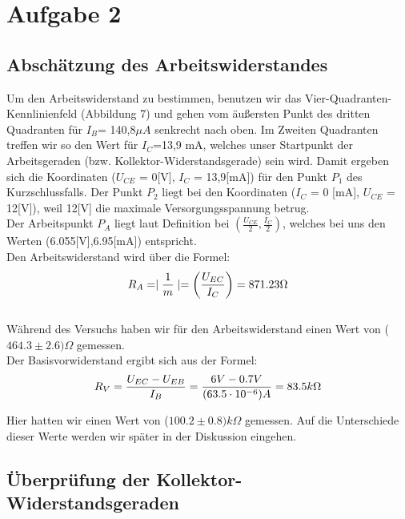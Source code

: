 \section{Aufgabe 2}
\subsection{Abschätzung des Arbeitswiderstandes}

Um den Arbeitswiderstand zu bestimmen, benutzen wir das Vier-Quadranten-Kennlinienfeld (Abbildung 7) und gehen vom äußersten Punkt des dritten Quadranten für \(I_B\)= 140,8\(\mu A\) senkrecht nach oben. Im Zweiten Quadranten treffen wir so den Wert für \(I_C\)=13,9 mA, welches unser Startpunkt der Arbeitsgeraden (bzw. Kollektor-Widerstandsgerade) sein wird. Damit ergeben sich die Koordinaten (\(U_{CE}\) = 0[V], \(I_{C}\) = 13,9[mA]) für den Punkt \(P_1\) des Kurzschlussfalls. Der Punkt \(P_2\) liegt bei den Koordinaten (\(I_{C}\) = 0 [mA], \(U_{CE}\) = 12[V]), weil 12[V] die maximale Versorgungsspannung betrug.\\
Der Arbeitspunkt \(P_{A}\) liegt laut Definition bei \(\left(\frac{U_{CE}}{2}, \frac{I_{C}}{2}\right)\), welches bei uns den Werten (6.055[V],6.95[mA]) entspricht.\\

Den Arbeitswiderstand wird über die Formel:
\begin{equation}
\notag
R_{A}=\mid \frac{1}{m}\mid = \left(\frac{U_{EC}}{I_C}\right) = 871.23 \Omega
\end{equation}\\

Während des Versuchs haben wir für den Arbeitswiderstand einen Wert von (\(464.3\pm 2.6)\Omega\) gemessen.\\

Der Basisvorwiderstand ergibt sich aus der Formel:
\begin{equation}
\notag
R_V= \frac{U_{EC}-U_{EB}}{I_B}=\frac{6V-0.7V}{(63.5\cdot 10^{-6})A}=83.5k\Omega
\end{equation}

Hier hatten wir einen Wert von (\(100.2\pm 0.8)k\Omega\) gemessen. Auf die Unterschiede dieser Werte werden wir später in der Diskussion eingehen.

\subsection{Überprüfung der Kollektor-Widerstandsgeraden}

